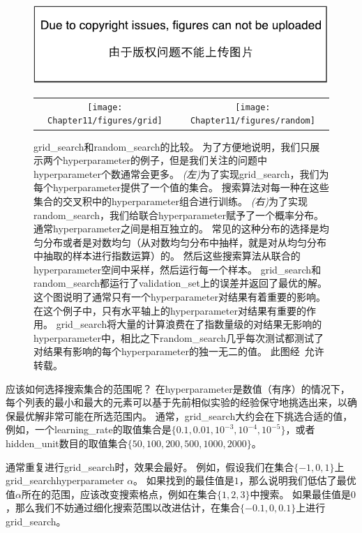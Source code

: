 \begin{figure}[!htb]
\ifOpenSource
\centerline{\includegraphics{figure.pdf}}
\else
\begin{tabular}{cc}
\texttt{[image: Chapter11/figures/grid]} &
\texttt{[image: Chapter11/figures/random]}
\end{tabular}
\fi
\caption{\gls{grid_search}和\gls{random_search}的比较。
为了方便地说明，我们只展示两个\gls{hyperparameter}的例子，但是我们关注的问题中\gls{hyperparameter}个数通常会更多。
\emph{(左)}为了实现\gls{grid_search}，我们为每个\gls{hyperparameter}提供了一个值的集合。
搜索算法对每一种在这些集合的交叉积中的\gls{hyperparameter}组合进行训练。
\emph{(右)}为了实现\gls{random_search}，我们给联合\gls{hyperparameter}赋予了一个概率分布。
通常\gls{hyperparameter}之间是相互独立的。
常见的这种分布的选择是均匀分布或者是对数均匀（从对数均匀分布中抽样，就是对从均匀分布中抽取的样本进行指数运算）的。
然后这些搜索算法从联合的\gls{hyperparameter}空间中采样，然后运行每一个样本。
\gls{grid_search}和\gls{random_search}都运行了\gls{validation_set}上的误差并返回了最优的解。
这个图说明了通常只有一个\gls{hyperparameter}对结果有着重要的影响。
在这个例子中，只有水平轴上的\gls{hyperparameter}对结果有重要的作用。
\gls{grid_search}将大量的计算浪费在了指数量级的对结果无影响的\gls{hyperparameter}中，相比之下\gls{random_search}几乎每次测试都测试了对结果有影响的每个\gls{hyperparameter}的独一无二的值。
此图经~\citet{Bergstra+Bengio-LW2011}允许转载。}
\label{fig:chap11_grid_vs_random}
\end{figure}


应该如何选择搜索集合的范围呢？
在\gls{hyperparameter}是数值（有序）的情况下，每个列表的最小和最大的元素可以基于先前相似实验的经验保守地挑选出来，以确保最优解非常可能在所选范围内。
通常，\gls{grid_search}大约会在下挑选合适的值，例如，一个\gls{learning_rate}的取值集合是$\{0.1,0.01,10^{-3},10^{-4},10^{-5}\}$，或者\gls{hidden_unit}数目的取值集合$\{50,100,200,500,1000,2000\}$。


通常重复进行\gls{grid_search}时，效果会最好。
例如，假设我们在集合$\{-1,0,1\}$上\gls{grid_search}\gls{hyperparameter} $\alpha$。
如果找到的最佳值是$1$，那么说明我们低估了最优值$\alpha$所在的范围，应该改变搜索格点，例如在集合$\{1,2,3\}$中搜索。
如果最佳值是$0$，那么我们不妨通过细化搜索范围以改进估计，在集合$\{-0.1,0,0.1\}$上进行\gls{grid_search}。


